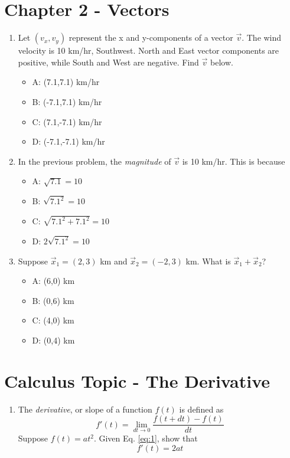 \documentclass{article}
\begin{document}
\section{Chapter 2 - Vectors}

\begin{enumerate}
\item Let $(v_x,v_y)$ represent the x and y-components of a vector $\vec{v}$.  The wind velocity is 10 km/hr, Southwest.  North and East vector components are positive, while South and West are negative.  Find $\vec{v}$ below.
\begin{itemize}
\item A: (7.1,7.1) km/hr
\item B: (-7.1,7.1) km/hr
\item C: (7.1,-7.1) km/hr
\item D: (-7.1,-7.1) km/hr
\end{itemize}
\item In the previous problem, the \textit{magnitude} of $\vec{v}$ is 10 km/hr.  This is because
\begin{itemize}
\item A: $\sqrt{7.1} = 10$
\item B: $\sqrt{7.1^2} = 10$
\item C: $\sqrt{7.1^2 + 7.1^2} = 10$
\item D: $2\sqrt{7.1^2} = 10$
\end{itemize}
\item Suppose $\vec{x}_1 = (2,3)$ km and $\vec{x}_2 = (-2,3)$ km.  What is $\vec{x}_1 + \vec{x}_2$?
\begin{itemize}
\item A: (6,0) km
\item B: (0,6) km
\item C: (4,0) km
\item D: (0,4) km
\end{itemize}
\end{enumerate}

\section{Calculus Topic - The Derivative}

\begin{enumerate}
\item The \textit{derivative}, or slope of a function $f(t)$ is defined as 
\begin{equation}
f'(t) = \lim_{dt \to 0} \frac{f(t+dt) - f(t)}{dt} \label{eq:1}
\end{equation}
Suppose $f(t) = a t^2$.  Given Eq. \ref{eq:1}, show that 
\begin{equation}
f'(t) = 2 a t
\end{equation}
\end{enumerate}
\end{document}
